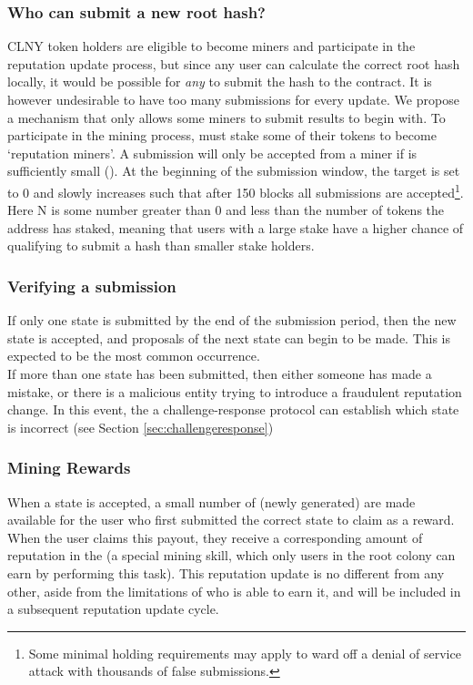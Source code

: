 \subsubsection*{Who can submit a new root hash?}
CLNY token holders are eligible to become miners and participate in the reputation update process, but since any user can calculate the correct root hash locally, it would be possible for \emph{any} \rcth to submit the hash to the contract.
It is however undesirable to have too many submissions for every update. We propose a mechanism that only allows some miners to submit results to begin with. To participate in the mining process, \rcths must stake some of their tokens to become `reputation miners'. A submission will only be accepted from a miner if  is sufficiently small ().  At the beginning of the submission window, the target is set to 0 and slowly increases such that after 150 blocks all submissions are accepted\footnote{Some minimal \rct holding requirements may apply to ward off a denial of service attack with thousands of false submissions.}. Here N is some number greater than 0 and less than the number of tokens the \rcth address has staked, meaning that users with a large stake have a higher chance of qualifying to submit a hash than smaller stake holders.
%
\subsubsection*{Verifying a submission}
If only one state is submitted by the end of the submission period, then the new state is accepted, and proposals of the next state can begin to be made. This is expected to be the most common occurrence.\\
If more than one state has been submitted, then either someone has made a mistake, or there is a malicious entity trying to introduce a fraudulent reputation change. In this event, the a challenge-response protocol can establish which state is incorrect (see Section \ref{sec:challengeresponse})

\subsubsection*{Mining Rewards}

When a state is accepted, a small number of (newly generated) \rcts are made available for the user who first submitted the correct state to claim as a reward. When the user claims this payout, they receive a corresponding amount of reputation in the \rc (a special mining skill, which only users in the root colony can earn by performing this task). This reputation update is no different from any other, aside from the limitations of who is able to earn it, and will be included in a subsequent reputation update cycle.

